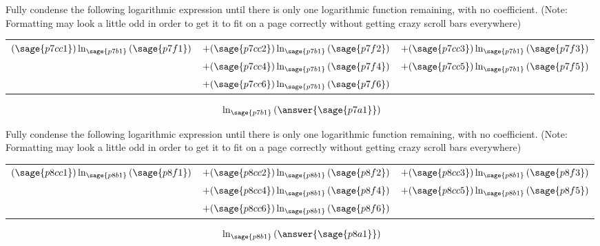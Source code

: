 \documentclass{ximera}
\begin{document}
\begin{problem}
    Fully condense the following logarithmic expression until there is only one logarithmic function remaining, with no coefficient. (Note: Formatting may look a little odd in order to get it to fit on a page correctly without getting crazy scroll bars everywhere)
    
    \begin{tabular}{lll}
        $(\sage{p7cc1})\logOld_{\sage{p7b1}}\left(\sage{p7f1}\right)$& $+ 
        (\sage{p7cc2})\logOld_{\sage{p7b1}}\left(\sage{p7f2}\right)$&$ + 
        (\sage{p7cc3})\logOld_{\sage{p7b1}}\left(\sage{p7f3}\right)$ \\
        &$+(\sage{p7cc4})\logOld_{\sage{p7b1}}\left(\sage{p7f4}\right)$&$ + 
        (\sage{p7cc5})\logOld_{\sage{p7b1}}\left(\sage{p7f5}\right)$ \\
        &$ + (\sage{p7cc6})\logOld_{\sage{p7b1}}\left(\sage{p7f6}\right)$
    \end{tabular}
    \[
        \logOld_{\sage{p7b1}}\left( \answer{\sage{p7a1}} \right)
    \]
\end{problem}



\begin{problem}
    Fully condense the following logarithmic expression until there is only one logarithmic function remaining, with no coefficient. (Note: Formatting may look a little odd in order to get it to fit on a page correctly without getting crazy scroll bars everywhere)
    
    \begin{tabular}{lll}
        $(\sage{p8cc1})\logOld_{\sage{p8b1}}\left(\sage{p8f1}\right)$& $+ 
        (\sage{p8cc2})\logOld_{\sage{p8b1}}\left(\sage{p8f2}\right)$&$ + 
        (\sage{p8cc3})\logOld_{\sage{p8b1}}\left(\sage{p8f3}\right)$ \\
        &$+(\sage{p8cc4})\logOld_{\sage{p8b1}}\left(\sage{p8f4}\right)$&$ + 
        (\sage{p8cc5})\logOld_{\sage{p8b1}}\left(\sage{p8f5}\right)$ \\
        &$ + (\sage{p8cc6})\logOld_{\sage{p8b1}}\left(\sage{p8f6}\right)$
    \end{tabular}
    \[
        \logOld_{\sage{p8b1}}\left( \answer{\sage{p8a1}} \right)
    \]
\end{problem}
\end{document}

